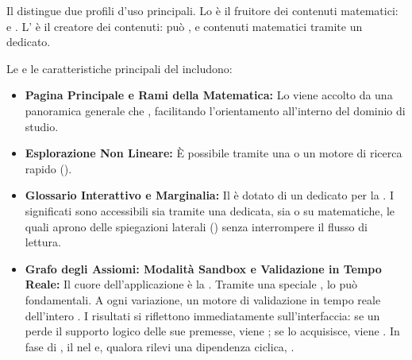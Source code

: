 \documentclass[12pt,a4paper]{article}
\begin{document}
Il  distingue due profili d'uso principali. Lo  è il fruitore dei contenuti matematici:  e . L' è il creatore dei contenuti: può ,  e  contenuti matematici tramite un  dedicato.

Le  e le caratteristiche principali del  includono:
\begin{itemize}
    \item \textbf{Pagina Principale e Rami della Matematica:} Lo  viene accolto da una panoramica generale che , facilitando l'orientamento all'interno del dominio di studio.
    \item \textbf{Esplorazione Non Lineare:} È possibile  tramite una  o un motore di ricerca rapido ().
    \item \textbf{Glossario Interattivo e Marginalia:} Il  è dotato di un  dedicato per la . I significati sono accessibili sia tramite una  dedicata, sia  o su  matematiche, le quali aprono delle spiegazioni laterali () senza interrompere il flusso di lettura.
    \item \textbf{Grafo degli Assiomi: Modalità Sandbox e Validazione in Tempo Reale:} Il cuore dell'applicazione è la . Tramite una speciale , lo  può  fondamentali. A ogni variazione, un motore di validazione in tempo reale  dell'intero . I risultati si riflettono immediatamente sull'interfaccia: se un  perde il supporto logico delle sue premesse, viene ; se lo acquisisce, viene . In fase di , il   nel  e, qualora rilevi una dipendenza ciclica, .

\end{itemize}
\end{document}
